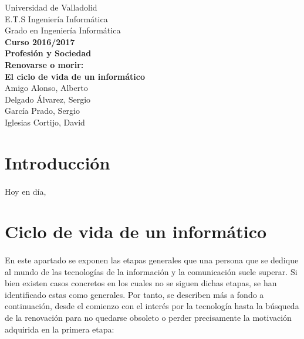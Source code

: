 \documentclass[11pt, a4paper]{report}
\begin{document}

	\begin{titlepage}
        \raggedleft
        {
        	\Large Universidad de Valladolid \\
        	E.T.S Ingeniería Informática \\
        	Grado en Ingeniería Informática\\
        }
        \vspace{4cm}
        \centering
        {
        	\bf \LARGE Curso 2016/2017 \\
        	 Profesión y Sociedad \\
            
             \vspace{1cm}
        	 Renovarse o morir: \\
             El ciclo de vida de un informático\\
        }
        \vspace{10cm}
        \raggedleft
        {
        	\Large 
            Amigo Alonso, Alberto \\
        	Delgado Álvarez, Sergio \\
            García Prado, Sergio \\
            Iglesias Cortijo, David \\
        }

  \end{titlepage}
  
	\newpage
    \tableofcontents

  	\newpage
  	\section{Introducción}
    	\paragraph{}
		Hoy en día, 
    
    
    \section{Ciclo de vida de un informático}
    	\paragraph{}
        En este apartado se exponen las etapas generales que una persona que se dedique al mundo de las tecnologías de la información y la comunicación suele superar. Si bien existen casos concretos en los cuales no se siguen dichas etapas, se han identificado estas como generales. Por tanto, se describen más a fondo a continuación, desde el comienzo con el interés por la tecnología hasta la búsqueda de la renovación para no quedarse obsoleto o perder precisamente la motivación adquirida en la primera etapa:
\end{document}
